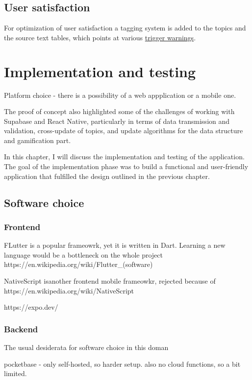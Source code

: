 \documentclass{article}
\begin{document}
\section{User satisfaction}
For optimization of user satisfaction a tagging system is added to the topics and the source text tables, which points at various \href{https://adancewithbooks.wordpress.com/2019/09/22/a-small-list-of-trigger-warnings-you-can-use/}{trigger warnings}.
\newpage

\chapter{Implementation and testing}
Platform choice - there is a possibility of a web appplication or a mobile one.

The proof of concept also highlighted some of the challenges of working with Supabase and React Native, particularly in terms of data transmission and validation, cross-update of topics, and update algorithms for the data structure and gamification part.

In this chapter, I will discuss the implementation and testing of the application. The goal of the implementation phase was to build a functional and user-friendly application that fulfilled the design outlined in the previous chapter.

\section{Software choice}

\subsection{Frontend}

FLutter is a popular frameowrk, yet it is written in Dart. Learning a new language would be a bottleneck on the whole project
https://en.wikipedia.org/wiki/Flutter_(software)

NativeScript isanother frontend mobile frameowkr, rejected because of
https://en.wikipedia.org/wiki/NativeScript


https://expo.dev/

\subsection{Backend}
The usual desiderata for software choice in this doman

pocketbase - only self-hosted, so harder setup. also no cloud functions, so a bit limited.
\end{document}
